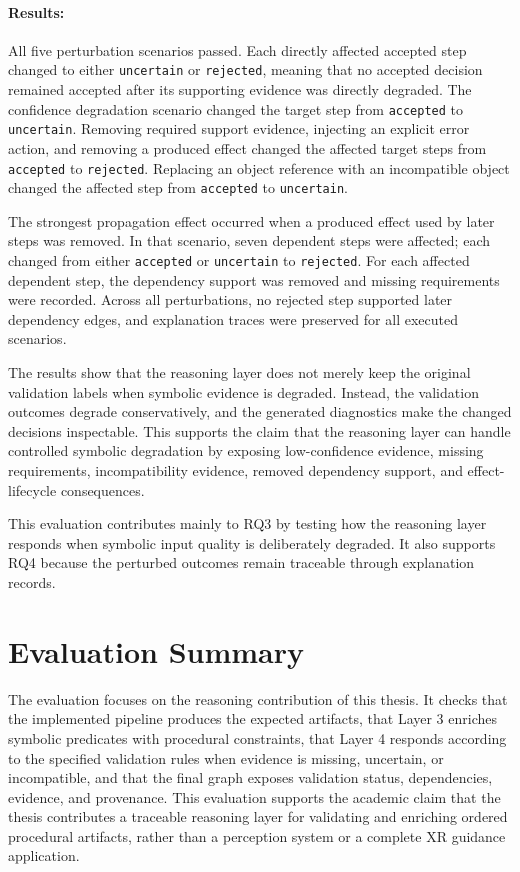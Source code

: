 \paragraph{Results:}
All five perturbation scenarios passed. Each directly affected accepted step
changed to either \texttt{uncertain} or \texttt{rejected}, meaning that no
accepted decision remained accepted after its supporting evidence was directly
degraded. The confidence degradation scenario changed the target step from
\texttt{accepted} to \texttt{uncertain}. Removing required support evidence,
injecting an explicit error action, and removing a produced effect changed the
affected target steps from \texttt{accepted} to \texttt{rejected}. Replacing an
object reference with an incompatible object changed the affected step from
\texttt{accepted} to \texttt{uncertain}.

The strongest propagation effect occurred when a produced effect used by later
steps was removed. In that scenario, seven dependent steps were affected; each
changed from either \texttt{accepted} or \texttt{uncertain} to
\texttt{rejected}. For each affected dependent step, the dependency support was
removed and missing requirements were recorded. Across all perturbations, no
rejected step supported later dependency edges, and explanation traces were
preserved for all executed scenarios.

The results show that the reasoning layer does not merely keep the original
validation labels when symbolic evidence is degraded. Instead, the validation
outcomes degrade conservatively, and the generated diagnostics make the changed
decisions inspectable. This supports the claim that the reasoning layer can
handle controlled symbolic degradation by exposing low-confidence evidence,
missing requirements, incompatibility evidence, removed dependency support, and
effect-lifecycle consequences.

This evaluation contributes mainly to RQ3 by testing how the reasoning layer
responds when symbolic input quality is deliberately degraded. It also supports
RQ4 because the perturbed outcomes remain traceable through explanation records.



\section{Evaluation Summary}
\label{sec:evaluation-summary}

The evaluation focuses on the reasoning contribution of this thesis. It checks that the implemented pipeline produces the expected artifacts, that Layer 3 enriches symbolic predicates with procedural constraints, that Layer 4 responds according to the specified validation rules when evidence is missing, uncertain, or incompatible, and that the final graph exposes validation status, dependencies, evidence, and provenance. This evaluation supports the academic claim that the thesis contributes a traceable reasoning layer for validating and enriching ordered procedural artifacts, rather than a perception system or a complete XR guidance application.

